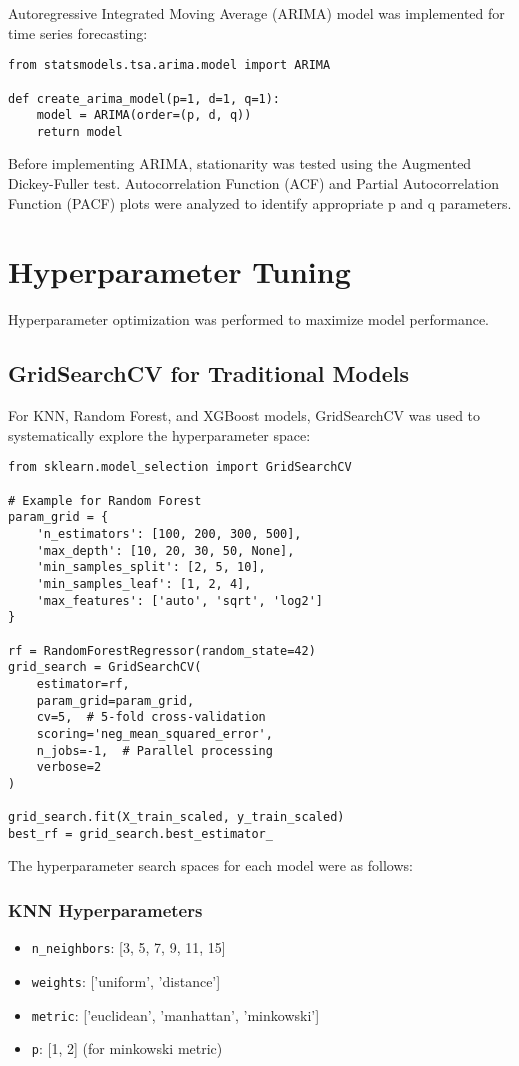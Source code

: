 \documentclass[12pt]{article}
\begin{document}
Autoregressive Integrated Moving Average (ARIMA) model was implemented for time series forecasting:

\begin{verbatim}
from statsmodels.tsa.arima.model import ARIMA

def create_arima_model(p=1, d=1, q=1):
    model = ARIMA(order=(p, d, q))
    return model
\end{verbatim}

Before implementing ARIMA, stationarity was tested using the Augmented Dickey-Fuller test. Autocorrelation Function (ACF) and Partial Autocorrelation Function (PACF) plots were analyzed to identify appropriate p and q parameters.

\section{Hyperparameter Tuning}
\label{sec:hyperparameter_tuning}

Hyperparameter optimization was performed to maximize model performance.

\subsection{GridSearchCV for Traditional Models}
\label{subsec:gridsearchcv}

For KNN, Random Forest, and XGBoost models, GridSearchCV was used to systematically explore the hyperparameter space:

\begin{verbatim}
from sklearn.model_selection import GridSearchCV

# Example for Random Forest
param_grid = {
    'n_estimators': [100, 200, 300, 500],
    'max_depth': [10, 20, 30, 50, None],
    'min_samples_split': [2, 5, 10],
    'min_samples_leaf': [1, 2, 4],
    'max_features': ['auto', 'sqrt', 'log2']
}

rf = RandomForestRegressor(random_state=42)
grid_search = GridSearchCV(
    estimator=rf,
    param_grid=param_grid,
    cv=5,  # 5-fold cross-validation
    scoring='neg_mean_squared_error',
    n_jobs=-1,  # Parallel processing
    verbose=2
)

grid_search.fit(X_train_scaled, y_train_scaled)
best_rf = grid_search.best_estimator_
\end{verbatim}

The hyperparameter search spaces for each model were as follows:

\subsubsection{KNN Hyperparameters}
\begin{itemize}
    \item \texttt{n\_neighbors}: [3, 5, 7, 9, 11, 15]
    \item \texttt{weights}: ['uniform', 'distance']
    \item \texttt{metric}: ['euclidean', 'manhattan', 'minkowski']
    \item \texttt{p}: [1, 2] (for minkowski metric)
\end{itemize}
\end{document}
